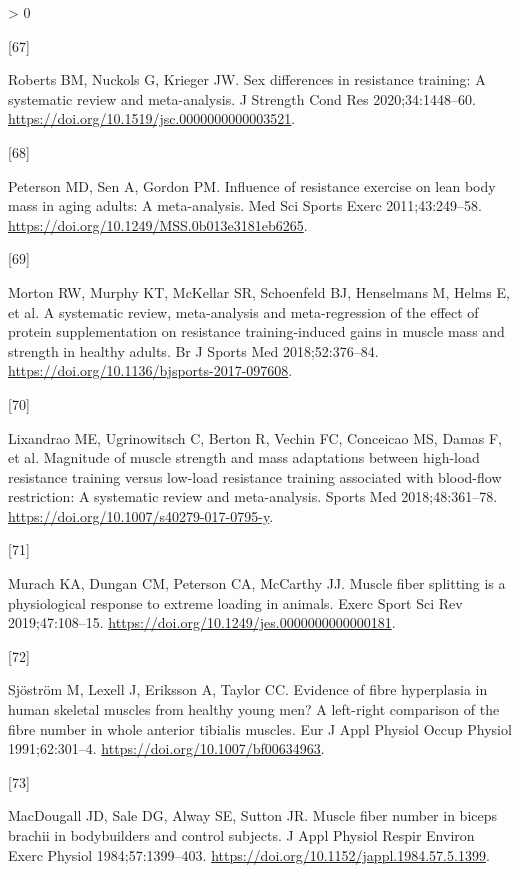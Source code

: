 \documentclass[twoside,10pt]{gihclass} %
\newlength{\cslhangindent}
\newlength{\csllabelwidth}
\newenvironment{CSLReferences}[3] %
 {%
  \setlength{\parindent}{0pt}
  \ifodd #1 \everypar{\setlength{\hangindent}{\cslhangindent}}\ignorespaces\fi
  \ifnum #2 > 0
  \setlength{\parskip}{#2\baselineskip}
  \fi
 }%
 {}
\newcommand{\CSLLeftMargin}[1]{\parbox[t]{\maxof{\widthof{#1}}{\csllabelwidth}}{#1}}
\newcommand{\CSLRightInline}[1]{\parbox[t]{\linewidth}{#1}}
\begin{document}
\begin{CSLReferences}{0}{0}
\leavevmode\hypertarget{ref-RN2740}{}%
\CSLLeftMargin{{[}67{]} }
\CSLRightInline{Roberts BM, Nuckols G, Krieger JW. Sex differences in resistance training: A systematic review and meta-analysis. J Strength Cond Res 2020;34:1448--60. \url{https://doi.org/10.1519/jsc.0000000000003521}.}

\leavevmode\hypertarget{ref-RN752}{}%
\CSLLeftMargin{{[}68{]} }
\CSLRightInline{Peterson MD, Sen A, Gordon PM. Influence of resistance exercise on lean body mass in aging adults: A meta-analysis. Med Sci Sports Exerc 2011;43:249--58. \url{https://doi.org/10.1249/MSS.0b013e3181eb6265}.}

\leavevmode\hypertarget{ref-RN2199}{}%
\CSLLeftMargin{{[}69{]} }
\CSLRightInline{Morton RW, Murphy KT, McKellar SR, Schoenfeld BJ, Henselmans M, Helms E, et al. A systematic review, meta-analysis and meta-regression of the effect of protein supplementation on resistance training-induced gains in muscle mass and strength in healthy adults. Br J Sports Med 2018;52:376--84. \url{https://doi.org/10.1136/bjsports-2017-097608}.}

\leavevmode\hypertarget{ref-RN2745}{}%
\CSLLeftMargin{{[}70{]} }
\CSLRightInline{Lixandrao ME, Ugrinowitsch C, Berton R, Vechin FC, Conceicao MS, Damas F, et al. Magnitude of muscle strength and mass adaptations between high-load resistance training versus low-load resistance training associated with blood-flow restriction: A systematic review and meta-analysis. Sports Med 2018;48:361--78. \url{https://doi.org/10.1007/s40279-017-0795-y}.}

\leavevmode\hypertarget{ref-RN2741}{}%
\CSLLeftMargin{{[}71{]} }
\CSLRightInline{Murach KA, Dungan CM, Peterson CA, McCarthy JJ. Muscle fiber splitting is a physiological response to extreme loading in animals. Exerc Sport Sci Rev 2019;47:108--15. \url{https://doi.org/10.1249/jes.0000000000000181}.}

\leavevmode\hypertarget{ref-RN2742}{}%
\CSLLeftMargin{{[}72{]} }
\CSLRightInline{Sjöström M, Lexell J, Eriksson A, Taylor CC. Evidence of fibre hyperplasia in human skeletal muscles from healthy young men? A left-right comparison of the fibre number in whole anterior tibialis muscles. Eur J Appl Physiol Occup Physiol 1991;62:301--4. \url{https://doi.org/10.1007/bf00634963}.}

\leavevmode\hypertarget{ref-RN2754}{}%
\CSLLeftMargin{{[}73{]} }
\CSLRightInline{MacDougall JD, Sale DG, Alway SE, Sutton JR. Muscle fiber number in biceps brachii in bodybuilders and control subjects. J Appl Physiol Respir Environ Exerc Physiol 1984;57:1399--403. \url{https://doi.org/10.1152/jappl.1984.57.5.1399}.}


\end{CSLReferences}
\end{document}
